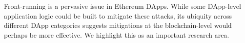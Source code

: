 Front-running is a pervasive issue in Ethereum DApps. While some DApp-level application logic could be built to mitigate these attacks, its ubiquity across different DApp categories suggests mitigations at the blockchain-level would perhaps be more effective. We highlight this as an important research area. 



